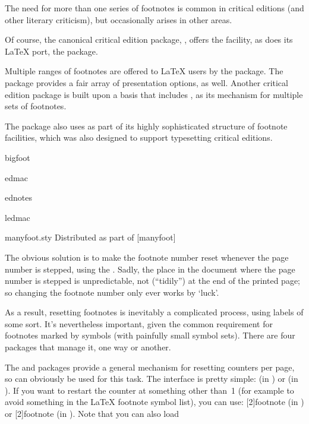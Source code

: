 
The need for more than one series of footnotes is common in critical
editions (and other literary criticism), but occasionally arises in
other areas.

Of course, the canonical critical edition package, ,
offers the facility, as does its \LaTeX{} port, the 
package.

Multiple ranges of footnotes are offered to \LaTeX{} users by the
 package.  The package provides a fair array of
presentation options, as well.  Another critical edition
 package is built upon a basis that includes
, as its mechanism for multiple sets of footnotes.

The  package also uses  as part of
its highly sophisticated structure of footnote facilities, which was
also designed to support typesetting critical editions.
\begin{ctanrefs}
\item[bigfoot]
\item[edmac]
\item[ednotes]
\item[ledmac]
\item[manyfoot.sty]Distributed as part of [manyfoot]
\end{ctanrefs}


The obvious solution is to make the footnote number reset whenever the
page number is stepped, using the %
.  Sadly, the place
in the document where the page number is stepped is unpredictable, not
(``tidily'') at the end of the printed page; so changing the footnote
number only ever works by `luck'.

As a result, resetting footnotes is inevitably a complicated process,
using labels of some sort.  It's nevertheless important, given the
common requirement for footnotes marked by symbols (with painfully
small symbol sets).  There are four packages that manage it, one way
or another.

The  and  packages provide a
general mechanism for resetting counters per page, so can obviously be
used for this task.  The interface is pretty simple:
 (in ) or
 (in ).  If
you want to restart the counter at something other than~1 (for example
to avoid something in the \LaTeX{} footnote symbol list), you can use:
[2]{footnote} (in ) or
[2]{footnote} (in ).
Note that you can also load  

